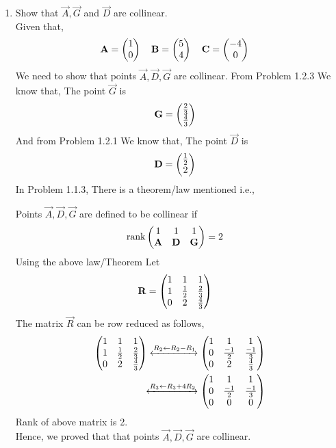 \documentclass[11pt]{book}
\begin{document}
\begin{enumerate}[label=\thesection.\arabic*.,ref=\thesection.\theenumi]
\item Show that $\vec{A}, \vec{G}$ and $\vec{D}$ are collinear.\\
\solution 
Given that,
\begin{align}
    \mathbf{A} = \begin{pmatrix}1\\0\end{pmatrix}
    \quad
    \mathbf{B} &= \begin{pmatrix}5\\4\end{pmatrix}
    \quad
    \mathbf{C} = \begin{pmatrix}-4\\0\end{pmatrix}
\end{align}
We need to show that points $\vec{A},\vec{D},\vec{G}$ are collinear.
From Problem 1.2.3 We know that, The point $\vec{G}$ is 
\begin{align}
    \mathbf{G} &=\begin{pmatrix}\frac{2}{3}\\ \frac{4}{3}\end{pmatrix}
\end{align}
And from Problem 1.2.1 We know that, The point $\vec{D}$ is 
\begin{align}
    \mathbf{D} &=\begin{pmatrix}\frac{1}{2}\\ 2\end{pmatrix}
\end{align}
In Problem 1.1.3, There is a theorem/law mentioned i.e.,

Points $\vec{A},\vec{D},\vec{G}$ are defined to be collinear if 
\begin{align}
    \text{rank}\begin{pmatrix}
    1 & 1 & 1\\
    \mathbf{A} & \mathbf{D} & \mathbf{G} \\
    \end{pmatrix} &= 2 
\end{align} 
Using the above law/Theorem Let
\begin{align}
    \mathbf{R}&=\begin{pmatrix}
    1 & 1 & 1
    \\
    1 & \frac{1}{2} & \frac{2}{3}
    \\
    0 & 2 & \frac{4}{3}
    \end{pmatrix} 
\end{align} 
The matrix $\vec{R}$ can be row reduced as follows,
\begin{align}
    \label{eq:mat_row_operations}
    \myvec{
    1 & 1 & 1
    \\
    1 & \frac{1}{2} & \frac{2}{3}
    \\
    0 & 2 & \frac{4}{3}
    }
     \xleftrightarrow[]{R_2 \leftarrow R_2-R_1}
    \myvec{
    1 & 1 & 1
    \\
    0 & \frac{-1}{2} & \frac{-1}{3}
    \\
    0 & 2 & \frac{4}{3} 
    }
    \\
     \xleftrightarrow[]{R_3\leftarrow R_3+4R_2}
    \myvec{
    1 & 1 & 1
    \\
    0 & \frac{-1}{2} & \frac{-1}{3}
    \\
    0 & 0 & 0
    }
\end{align}
Rank of above matrix is 2.\\
Hence, we proved that that points $\vec{A},\vec{D},\vec{G}$ are collinear.




\end{enumerate}
\end{document}
